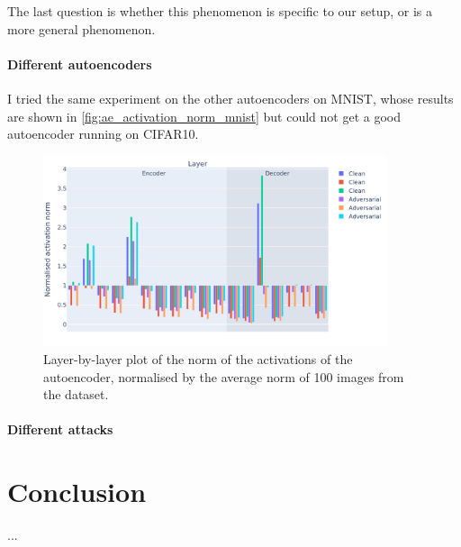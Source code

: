 \documentclass[]{scrarticle}
\begin{document}
The last question is whether this phenomenon is specific to
our setup, or is a more general phenomenon.

\paragraph{Different autoencoders}
I tried the same experiment on the other autoencoders
on MNIST, whose results are shown in
\autoref{fig:ae_activation_norm_mnist}
but could not get a good autoencoder running on CIFAR10.

\begin{figure}[h]
  \centering
  \includegraphics[width=0.9\textwidth]{images/ae_activation_norm_MNIST.png}
  \caption{
    Layer-by-layer plot of the norm of the activations of the autoencoder,
    normalised by the average norm of 100 images from the dataset.
  }
  \label{fig:ae_activation_norm_mnist}
\end{figure}




\paragraph{Different attacks}





\section*{Conclusion}

...

\newpage


\end{document}
